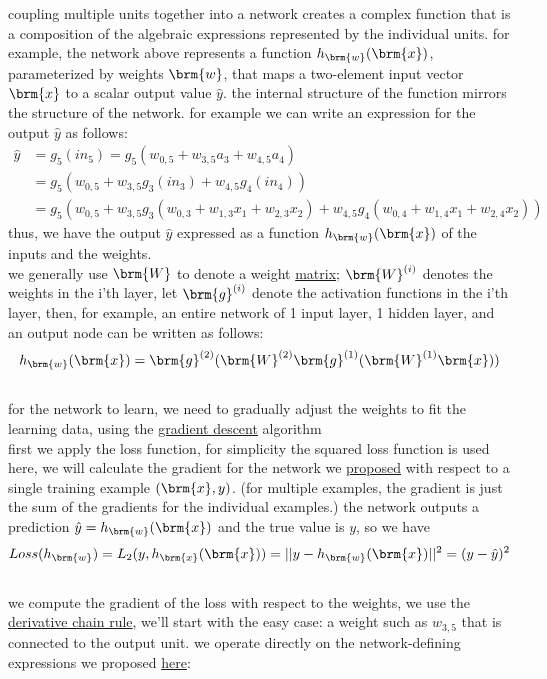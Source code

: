 \documentclass[a4paper,12pt]{article}
\begin{document}
coupling multiple units together into a network creates a complex function that is a composition of the algebraic expressions represented by the individual units. for example, the network above represents a function \(h_{\brm{w}}(\brm{x})\), parameterized by weights \(\brm{w}\), that maps a two-element input vector \(\brm{x}\) to a scalar output value \(\hat y\). the internal structure of the function mirrors the structure of the network. for example we can write an expression for the output \(\hat y\) as follows:\\
\begin{align*}
\label{eq:orgc390179}
  \hat y &= g_5(in_5) = g_5(w_{0,5} + w_{3,5}a_3 + w_{4,5}a_4)\\
  &= g_5(w_{0,5} + w_{3,5}g_3(in_3) + w_{4,5}g_4(in_4))\\
  &= g_5(w_{0,5} + w_{3,5}g_3(w_{0,3} + w_{1,3}x_1 + w_{2,3}x_2) + w_{4,5}g_4(w_{0,4} + w_{1,4}x_1 + w_{2,4}x_2))
\end{align*}
thus, we have the output \(\hat y\) expressed as a function \(h_{\brm{w}}(\brm{x})\) of the inputs and the weights.\\
we generally use \(\brm{W}\) to denote a weight \href{linear_algebra2.org}{matrix}; \(\brm{W}^{(i)}\) denotes the weights in the i'th layer, let \(\brm{g}^{(i)}\) denote the activation functions in the i'th layer, then, for example, an entire network of 1 input layer, 1 hidden layer, and an output node can be written as follows:\\
\[
h_{\brm{w}}(\brm{x}) = \brm{g}^{(2)}(\brm{W}^{(2)}\brm{g}^{(1)}(\brm{W}^{(1)}\brm{x}))
\]\\
for the network to learn, we need to gradually adjust the weights to fit the learning data, using the \href{20230422235640-gradient_descent.org}{gradient descent} algorithm\\
first we apply the loss function, for simplicity the squared loss function is used here, we will calculate the gradient for the network we \hyperref[fig:org20b9478]{proposed} with respect to a single training example \((\brm{x},y)\). (for multiple examples, the gradient is just the sum of the gradients for the individual examples.) the network outputs a prediction \(\hat y = h_{\brm{w}}(\brm{x})\) and the true value is \(y\), so we have\\
\[
Loss(h_{\brm{w}}) = L_2(y,h_{\brm{x}}(\brm{x})) = ||y-h_{\brm{w}}(\brm{x})||^2 = (y-\hat y)^2
\]\\
we compute the gradient of the loss with respect to the weights, we use the \href{calculus2.org}{derivative chain rule}, we'll start with the easy case: a weight such as \(w_{3,5}\) that is connected to the output unit. we operate directly on the network-defining expressions we proposed \hyperref[eq:orgc390179]{here}:\\
\end{document}
